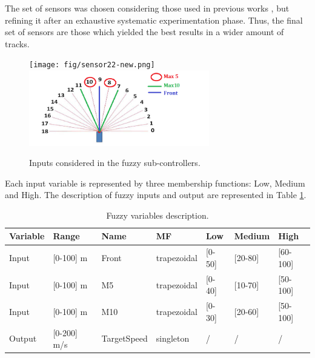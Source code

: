 \documentclass[runningheads,a4paper]{llncs}
\begin{document}
	The set of sensors was chosen considering those used in previous works \cite{torcs2012}, but refining it after an exhaustive systematic experimentation phase. Thus, the final set of sensors are those which yielded the best results in a wider amount of tracks.
	
	\begin{figure}[ht!]
		
		\centering
		\texttt{[image: fig/sensor22-new.png]}
		\includegraphics[width=0.7\textwidth]{fig/front.png}
		\begin{minipage}{10cm}
			\centering
			\caption{Inputs considered in the fuzzy sub-controllers.}
			\label{fig34}
		\end{minipage} 		
	\end{figure}
	
	Each input variable is represented by three membership functions: Low, Medium and High. The description of fuzzy inputs and output are represented in Table \ref{tab:flouevar}.
	
	\begin{table}
		\caption{Fuzzy variables description.}
		\label{tab:flouevar}
		\begin{tabular}{ |p{1.5cm}|p{2cm}|p{2cm}|p{2 cm}|p{1 cm}|p{1.5 cm}|p{1.5 cm}|}
			\hline
			{ \color{red} Variable }&
			{ \color{red} Range }&
			{ \color{red} Name}&  
			{ \color{red} MF } &
			{ \color{red} Low } &
			{ \color{red} Medium }&
			{ \color{red} High } 
			
			\\
			\hline
			\hline
			Input & [0-100] m & Front & trapezoidal & [0-50] & [20-80] & [60-100]
			\\
			\hline
			Input & [0-100] m & M5 & trapezoidal &[0-40] & [10-70] & [50-100] 
			\\
			\hline
			Input & [0-100] m  & M10 & trapezoidal & [0-30] & [20-60] & [50-100]
			\\
			\hline 
			Output & [0-200] m/s & TargetSpeed & singleton & / & / & /
			\\
			\hline 
		\end{tabular} 
	\end{table}
	
\end{document}
